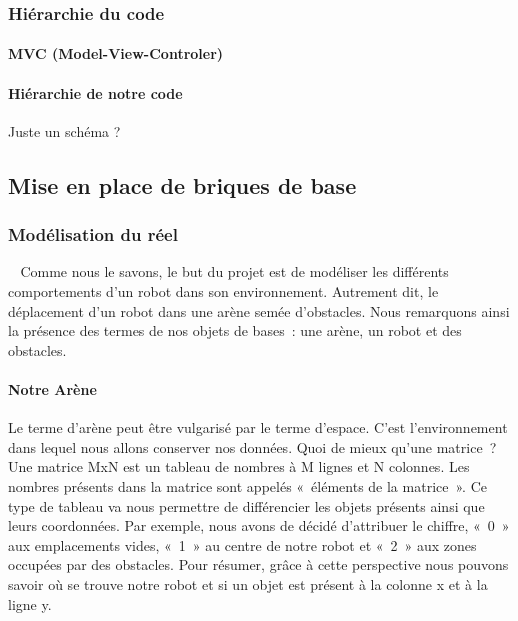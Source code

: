 \documentclass[12pt]{article}
\def\tab{$\>\>\>\>$}
\begin{document}

\subsubsection{Hiérarchie du code}

\paragraph{MVC (Model-View-Controler)\\}

\paragraph{Hiérarchie de notre code\\}

\begin{center}
Juste un schéma ?
\end{center}

\newpage
\subsection{Mise en place de briques de base}
\subsubsection{Modélisation du réel}
\tab Comme nous le savons, le but du projet est de modéliser les différents comportements d’un robot dans son environnement. Autrement dit, le déplacement d’un robot dans une arène semée d’obstacles. Nous remarquons ainsi la présence des termes de nos objets de bases : une arène, un robot et des obstacles.
\paragraph{Notre Arène\\}
Le terme d’arène peut être vulgarisé par le terme d’espace. C’est l’environnement dans lequel nous allons conserver nos données. Quoi de mieux qu’une matrice ? Une matrice MxN est un tableau de nombres à M lignes et N colonnes. Les nombres présents dans la matrice sont appelés « éléments de la matrice ».  Ce type de tableau va nous permettre de différencier les objets présents ainsi que leurs coordonnées. Par exemple, nous avons de décidé d’attribuer le chiffre, « 0 » aux emplacements vides, « 1 » au centre de notre robot et « 2 » aux zones occupées par des obstacles. Pour résumer, grâce à cette perspective nous pouvons savoir où se trouve notre robot et si un objet est présent à la colonne x et à la ligne y.
\end{document}
